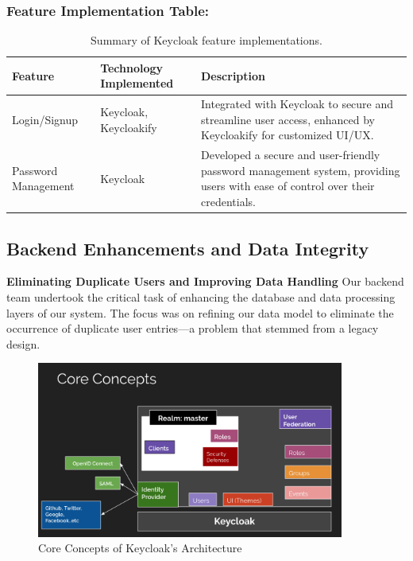 \subsubsection{Feature Implementation Table:}
\begin{table}[H]
\centering
\begin{tabularx}{\textwidth}{|X|X|X|}
\hline
\textbf{Feature} & \textbf{Technology Implemented} & \textbf{Description} \\
\hline
Login/Signup & Keycloak, Keycloakify & Integrated with Keycloak to secure and streamline user access, enhanced by Keycloakify for customized UI/UX. \\
\hline
Password Management & Keycloak & Developed a secure and user-friendly password management system, providing users with ease of control over their credentials. \\
\hline
\end{tabularx}
\caption{Summary of Keycloak feature implementations.}
\label{tab:keycloak_features}
\end{table}

\subsection{Backend Enhancements and Data Integrity}
\textbf{Eliminating Duplicate Users and Improving Data Handling}
Our backend team undertook the critical task of enhancing the database and data processing layers of our system. The focus was on refining our data model to eliminate the occurrence of duplicate user entries—a problem that stemmed from a legacy design.
 
\begin{figure}[H]
    \centering
    \includegraphics[width=0.9\textwidth]{src/assets/chapters/core-conccept.png}
    \caption{Core Concepts of Keycloak's Architecture}
    \label{fig:core_concepts_keycloak}
\end{figure}

